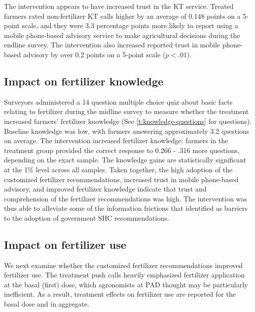 \documentclass{article}
\begin{document}
The intervention appears to have increased trust in the KT service. Treated farmers rated non-fertilizer KT calls higher by an average of 0.148 points on a 5-point scale, and they were 3.3 percentage points more likely to report using a mobile phone-based advisory service to make agricultural decisions during the endline survey. The intervention also increased reported trust in mobile phone-based advisory by over 0.2 points on a 5-point scale ($p < .01$). 

\subsection{Impact on fertilizer knowledge}

Surveyors administered a 14 question multiple choice quiz about basic facts relating to fertilizer during the midline survey to measure whether the treatment increased farmers’ fertilizer knowledge (See \ref{t:knowledge-questions} for questions). Baseline knowledge was low, with farmers answering approximately 3.2 questions on average. The intervention increased fertilizer knowledge: farmers in the treatment group provided the correct response to 0.266 - .316 more questions, depending on the exact sample. The knowledge gains are statistically significant at the 1\% level across all samples. Taken together, the high adoption of the customized fertilizer recommendations, increased trust in mobile phone-based advisory, and improved fertilizer knowledge indicate that trust and comprehension of the fertilizer recommendations was high. The intervention was thus able to alleviate some of the information frictions that \citet{Fishman2016CanBihar} identified as barriers to the adoption of government SHC recommendations.  

\subsection{Impact on fertilizer use}

We next examine whether the customized fertilizer recommendations improved fertilizer use. The treatment push calls heavily emphasized fertilizer application at the basal (first) dose, which agronomists at PAD thought may be particularly inefficient. As a result, treatment effects on fertilizer use are reported for the basal dose and in aggregate.
\end{document}
